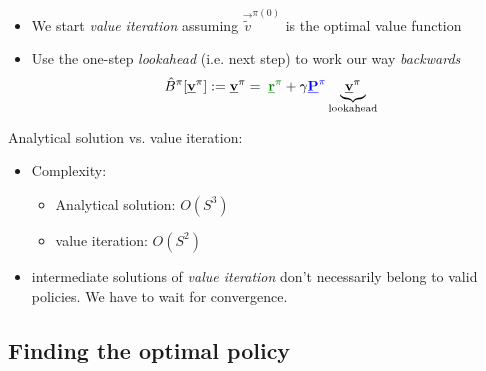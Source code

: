 \begin{frame}\frametitle{\subsubsecname}
    

\begin{itemize}
\item We start \emph{value iteration} assuming $\vec {\tilde v}^{\pi (0)}$ is the optimal value function
\item Use the one-step \emph{lookahead} (i.e. next step) to work our way \emph{backwards}\\

	\begin{equation*}
		\hat B^\pi[\vec v^\pi] := \vec v^\pi
		= \; {\color{reward}\vec r^\pi} 
			+ \gamma {\color{trans}\vec P^\pi} \underbrace{\vec v^\pi}_{\text{lookahead}}
	\end{equation*}
\end{itemize}

Analytical solution vs. value iteration:

\begin{itemize}
\item Complexity: 
\begin{itemize}
\item Analytical solution: $O(S^{3})$
\item value iteration: $O(S^{2})$
\end{itemize}   
\item intermediate solutions of \emph{value iteration} don't necessarily belong to valid policies. We have to wait for convergence.
\end{itemize}

\end{frame}

\subsection{Finding the optimal policy}

